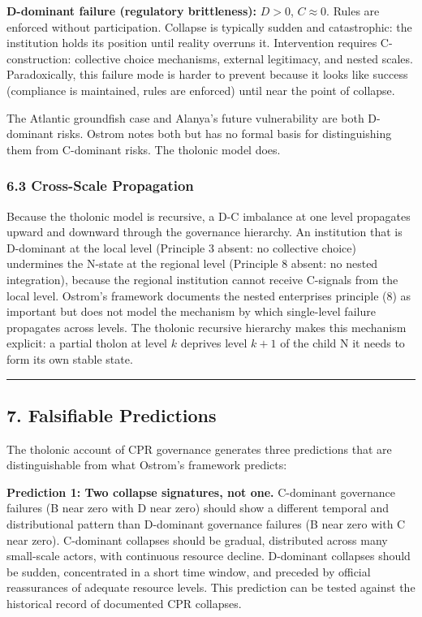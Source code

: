 \documentclass[
  11pt,
  letterpaper,
]{article}
\begin{document}
\textbf{D-dominant failure (regulatory brittleness):} \(D > 0\),
\(C \approx 0\). Rules are enforced without participation. Collapse is
typically sudden and catastrophic: the institution holds its position
until reality overruns it. Intervention requires C-construction:
collective choice mechanisms, external legitimacy, and nested scales.
Paradoxically, this failure mode is harder to prevent because it looks
like success (compliance is maintained, rules are enforced) until near
the point of collapse.

The Atlantic groundfish case and Alanya's future vulnerability are both
D-dominant risks. Ostrom notes both but has no formal basis for
distinguishing them from C-dominant risks. The tholonic model does.

\subsubsection{6.3 Cross-Scale
Propagation}\label{cross-scale-propagation}

Because the tholonic model is recursive, a D-C imbalance at one level
propagates upward and downward through the governance hierarchy. An
institution that is D-dominant at the local level (Principle 3 absent:
no collective choice) undermines the N-state at the regional level
(Principle 8 absent: no nested integration), because the regional
institution cannot receive C-signals from the local level. Ostrom's
framework documents the nested enterprises principle (8) as important
but does not model the mechanism by which single-level failure
propagates across levels. The tholonic recursive hierarchy makes this
mechanism explicit: a partial tholon at level \(k\) deprives level
\(k+1\) of the child N it needs to form its own stable state.

\begin{center}\rule{0.5\linewidth}{0.5pt}\end{center}

\subsection{7. Falsifiable Predictions}\label{falsifiable-predictions}

The tholonic account of CPR governance generates three predictions that
are distinguishable from what Ostrom's framework predicts:

\textbf{Prediction 1: Two collapse signatures, not one.} C-dominant
governance failures (B near zero with D near zero) should show a
different temporal and distributional pattern than D-dominant governance
failures (B near zero with C near zero). C-dominant collapses should be
gradual, distributed across many small-scale actors, with continuous
resource decline. D-dominant collapses should be sudden, concentrated in
a short time window, and preceded by official reassurances of adequate
resource levels. This prediction can be tested against the historical
record of documented CPR collapses.
\end{document}
